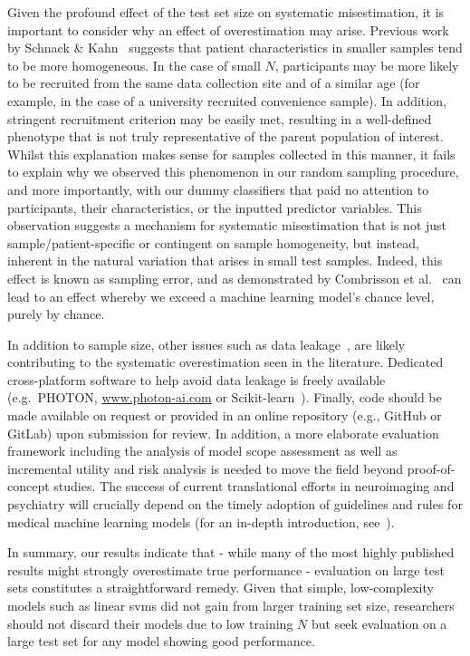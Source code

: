\documentclass[12pt,a4paper]{article}
\begin{document}
    Given the profound effect of the test set size on systematic misestimation, it is important to consider why an effect of overestimation may arise. Previous work by Schnack \& Kahn~\cite{Schnack2016} suggests that patient characteristics in smaller samples tend to be more homogeneous. In the case of small $N$, participants may be more likely to be recruited from the same data collection site and of a similar age (for example, in the case of a university recruited convenience sample). In addition, stringent recruitment criterion may be easily met, resulting in a well-defined phenotype that is not truly representative of the parent population of interest. Whilst this explanation makes sense for samples collected in this manner, it fails to explain why we observed this phenomenon in our random sampling procedure, and more importantly, with our dummy classifiers that paid no attention to participants, their characteristics, or the inputted predictor variables. This observation suggests a mechanism for systematic misestimation that is not just sample/patient-specific or contingent on sample homogeneity, but instead, inherent in the natural variation that arises in small test samples. Indeed, this effect is known as sampling error, and as demonstrated by Combrisson et al.~\cite{Combrisson2015} can lead to an effect whereby we exceed a machine learning model's chance level, purely by chance.

    In addition to sample size, other issues such as data leakage~\cite{Kambeitz2017}, are likely contributing to the systematic overestimation seen in the literature. Dedicated cross-platform software to help avoid data leakage is freely available (e.g.\ PHOTON, \url{www.photon-ai.com} or Scikit-learn~\cite{scikit-learn}). Finally, code should be made available on request or provided in an online repository (e.g., GitHub or GitLab) upon submission for review. In addition, a more elaborate evaluation framework including the analysis of model scope assessment as well as incremental utility and risk analysis is needed to move the field beyond proof-of-concept studies. The success of current translational efforts in neuroimaging and psychiatry will crucially depend on the timely adoption of guidelines and rules for medical machine learning models (for an in-depth introduction, see~\cite{Hahn2019}).

    In summary, our results indicate that - while many of the most highly published results might strongly overestimate true performance - evaluation on large test sets constitutes a straightforward remedy. Given that simple, low-complexity models such as linear \acp{svm} did not gain from larger training set size, researchers should not discard their models due to low training $N$ but seek evaluation on a large test set for any model showing good performance.
\end{document}
